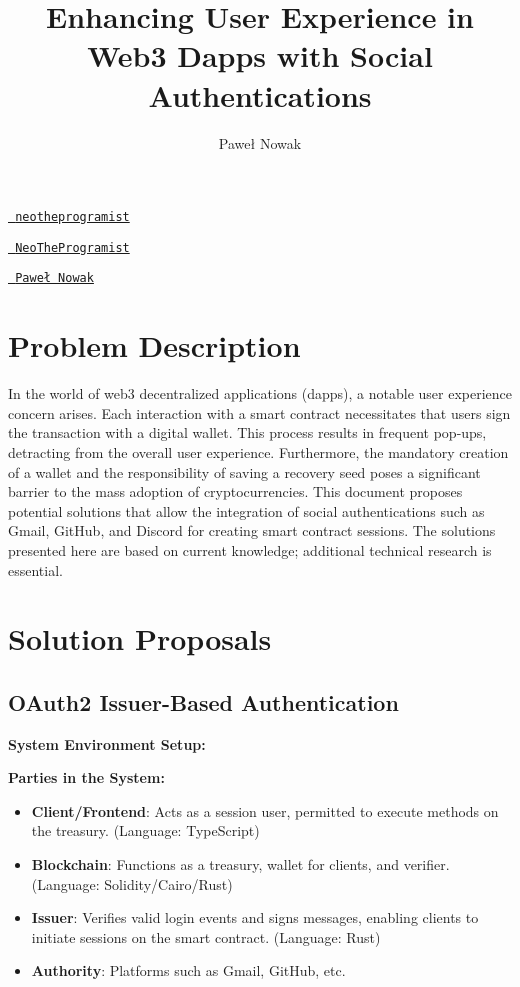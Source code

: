 \documentclass{article}
\title{Enhancing User Experience in Web3 Dapps with Social Authentications}
\author{Paweł Nowak} %
\date{}
\begin{document}
\maketitle
\href{https://github.com/neotheprogramist}{\faGithub \texttt{ neotheprogramist}}

\href{https://t.me/NeoTheProgramist}{\faTelegram \texttt{ NeoTheProgramist}}

\href{https://www.linkedin.com/in/pawe%C5%82-nowak-2b37531b1/}{\faLinkedin \texttt{ Paweł Nowak}} 

\section{Problem Description}

In the world of web3 decentralized applications (dapps), a notable user experience concern arises. Each interaction with a smart contract necessitates that users sign the transaction with a digital wallet. This process results in frequent pop-ups, detracting from the overall user experience. Furthermore, the mandatory creation of a wallet and the responsibility of saving a recovery seed poses a significant barrier to the mass adoption of cryptocurrencies. This document proposes potential solutions that allow the integration of social authentications such as Gmail, GitHub, and Discord for creating smart contract sessions. The solutions presented here are based on current knowledge; additional technical research is essential.

\section{Solution Proposals}

\subsection{OAuth2 Issuer-Based Authentication}

\textbf{System Environment Setup:}

\textbf{Parties in the System:}
\begin{itemize}
    \item \textbf{Client/Frontend}: Acts as a session user, permitted to execute methods on the treasury. (Language: TypeScript)
    \item \textbf{Blockchain}: Functions as a treasury, wallet for clients, and verifier. (Language: Solidity/Cairo/Rust)
    \item \textbf{Issuer}: Verifies valid login events and signs messages, enabling clients to initiate sessions on the smart contract. (Language: Rust)
    \item \textbf{Authority}: Platforms such as Gmail, GitHub, etc.
\end{itemize}
\end{document}
